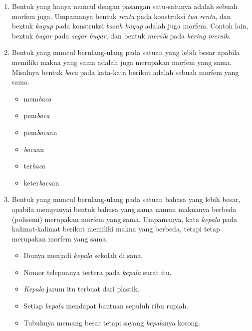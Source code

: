 \begin{enumerate}
	\item Bentuk yang hanya muncul dengan pasangan satu-satunya adalah sebuah morfem juga. Umpamanya bentuk \textit{renta} pada konstruksi \textit{tua renta}, dan bentuk \textit{kuyup} pada konstruksi \textit{basah kuyup} adalah juga morfem. Contoh lain, bentuk \textit{bugar} pada \textit{segar bugar}, dan bentuk \textit{mersik} pada \textit{kering mersik}.
	
	\item Bentuk yang muncul berulang-ulang pada satuan yang lebih besar apabila memiliki makna yang sama adalah juga merupakan morfem yang sama. Misalnya bentuk \textit{baca} pada kata-kata berikut adalah sebuah morfem yang sama.
	\begin{itemize}
		\item mem\textit{baca}
		\item pem\textit{baca}
		\item pem\textit{baca}an
		\item \textit{baca}an
		\item ter\textit{baca}
		\item keter\textit{baca}an
	\end{itemize}
	
	\item Bentuk yang muncul berulang-ulang pada satuan bahasa yang lebih besar, apabila mempunyai bentuk bahasa yang sama namun maknanya berbeda (polisemi) merupakan morfem yang sama. Umpamanya, kata \textit{kepala} pada kalimat-kalimat berikut memiliki makna yang berbeda, tetapi tetap merupakan morfem yang sama.
	\begin{itemize}
		\item Ibunya menjadi \textit{kepala} sekolah di sana.
		\item Nomor teleponnya tertera pada \textit{kepala} surat itu.
		\item \textit{Kepala} jarum itu terbuat dari plastik.
		\item Setiap \textit{kepala} mendapat bantuan sepuluh ribu rupiah.
		\item Tubuhnya memang besar tetapi sayang \textit{kepala}nya kosong.
	\end{itemize}
\end{enumerate}


